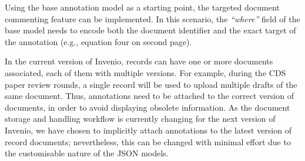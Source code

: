 
Using the base annotation model as a starting point, the targeted document
commenting feature can be implemented. In this scenario, the \textit{``where''}
field of the base model needs to encode both the document identifier and the
exact target of the annotation (e.g., equation four on second page).

In the current version of Invenio, records can have one or more documents
associated, each of them with multiple versions. For example, during the CDS
paper review rounds, a single record will be used to upload multiple drafts of
the same document. Thus, annotations need to be attached to the correct version
of documents, in order to avoid displaying obsolete information. As the
document storage and handling workflow is currently changing for the next
version of Invenio, we have chosen to implicitly attach annotations to the
latest version of record documents; nevertheless, this can be changed with
minimal effort due to the customisable nature of the JSON models.

